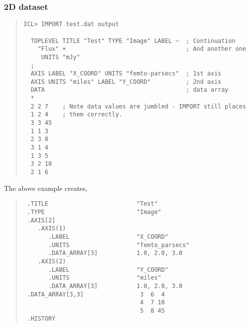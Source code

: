 \documentclass{book}
\renewcommand{\_}{{\tt\char'137}}     %
\begin{document}
\subsubsection{2D dataset}
\begin{quote}\begin{verbatim}
ICL> IMPORT test.dat output

  TOPLEVEL TITLE "Test" TYPE "Image" LABEL ~  ; Continuation
    "Flux" +                                  ; And another one
     UNITS "mJy"
  ;
  AXIS LABEL "X_COORD" UNITS "femto-parsecs"  ; 1st axis
  AXIS UNITS "miles" LABEL "Y_COORD"          ; 2nd axis
  DATA                                        ; data array
  *
  2 2 7    ; Note data values are jumbled - IMPORT still places
  1 2 4    ; them correctly.
  3 3 45
  1 1 3
  2 3 8
  3 1 4
  1 3 5
  3 2 10
  2 1 6
\end{verbatim}\end{quote}
The above example creates,
\begin{quote}\begin{verbatim}
 .TITLE                         "Test"
 .TYPE                          "Image"
 .AXIS[2]
    .AXIS(1)
       .LABEL                   "X_COORD"
       .UNITS                   "femto_parsecs"
       .DATA_ARRAY[3]           1.0, 2.0, 3.0
    .AXIS(2)
       .LABEL                   "Y_COORD"
       .UNITS                   "miles"
       .DATA_ARRAY[3]           1.0, 2.0, 3.0
 .DATA_ARRAY[3,3]                3  6  4
                                 4  7 10
                                 5  8 45
 .HISTORY
\end{verbatim}\end{quote}
\end{document}
